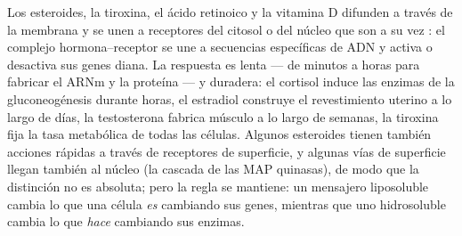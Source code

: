 \begin{proposition}\label{prop:b2:cell-signalling:nuclear}
Los esteroides, la tiroxina, el ácido retinoico y la vitamina D difunden a
través de la membrana y se unen a receptores del citosol o del núcleo que
son a su vez \emph{}: el complejo
hormona--receptor se une a secuencias específicas de ADN y activa o
desactiva sus genes diana. La respuesta es lenta --- de minutos a horas
para fabricar el ARNm y la proteína --- y duradera: el cortisol induce las
enzimas de la gluconeogénesis durante horas, el estradiol construye el
revestimiento uterino a lo largo de días, la testosterona fabrica músculo
a lo largo de semanas, la tiroxina fija la tasa metabólica de todas las
células. Algunos esteroides tienen también acciones rápidas a través de
receptores de superficie, y algunas vías de superficie llegan también al
núcleo (la cascada de las MAP quinasas), de modo que la distinción no es
absoluta; pero la regla se mantiene: un mensajero liposoluble cambia lo
que una célula \emph{es} cambiando sus genes, mientras que uno
hidrosoluble cambia lo que \emph{hace} cambiando sus
enzimas.
\end{proposition}

